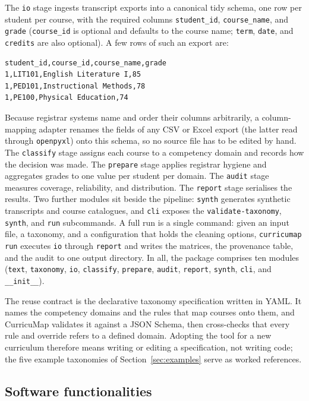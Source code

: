 \documentclass[11pt]{article}
\begin{document}
The \texttt{io} stage ingests transcript exports into a canonical tidy schema, one row per student per course, with the required columns \texttt{student\_id}, \texttt{course\_name}, and \texttt{grade} (\texttt{course\_id} is optional and defaults to the course name; \texttt{term}, \texttt{date}, and \texttt{credits} are also optional). A few rows of such an export are:
\begin{verbatim}
student_id,course_id,course_name,grade
1,LIT101,English Literature I,85
1,PED101,Instructional Methods,78
1,PE100,Physical Education,74
\end{verbatim}
Because registrar systems name and order their columns arbitrarily, a column-mapping adapter renames the fields of any CSV or Excel export (the latter read through \texttt{openpyxl}) onto this schema, so no source file has to be edited by hand. The \texttt{classify} stage assigns each course to a competency domain and records how the decision was made. The \texttt{prepare} stage applies registrar hygiene and aggregates grades to one value per student per domain. The \texttt{audit} stage measures coverage, reliability, and distribution. The \texttt{report} stage serialises the results. Two further modules sit beside the pipeline: \texttt{synth} generates synthetic transcripts and course catalogues, and \texttt{cli} exposes the \texttt{validate-taxonomy}, \texttt{synth}, and \texttt{run} subcommands. A full run is a single command: given an input file, a taxonomy, and a configuration that holds the cleaning options, \texttt{curricumap run} executes \texttt{io} through \texttt{report} and writes the matrices, the provenance table, and the audit to one output directory. In all, the package comprises ten modules (\texttt{text}, \texttt{taxonomy}, \texttt{io}, \texttt{classify}, \texttt{prepare}, \texttt{audit}, \texttt{report}, \texttt{synth}, \texttt{cli}, and \texttt{\_\_init\_\_}).

The reuse contract is the declarative taxonomy specification written in YAML. It names the competency domains and the rules that map courses onto them, and CurricuMap validates it against a JSON Schema, then cross-checks that every rule and override refers to a defined domain. Adopting the tool for a new curriculum therefore means writing or editing a specification, not writing code; the five example taxonomies of Section~\ref{sec:examples} serve as worked references.

\subsection{Software functionalities}
\end{document}
